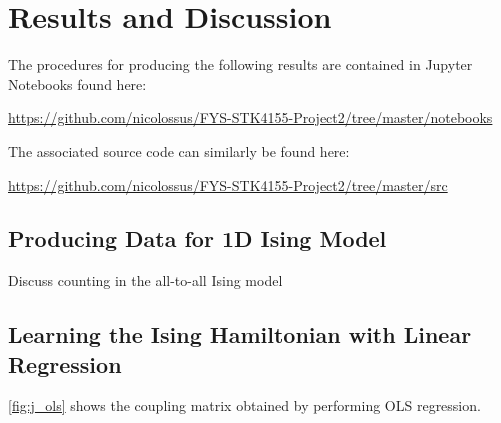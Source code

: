 \section{Results and Discussion}\label{sec:Results}

The procedures for producing the following results are contained in Jupyter Notebooks found here:
\begin{center}
    \url{https://github.com/nicolossus/FYS-STK4155-Project2/tree/master/notebooks}
\end{center}

The associated source code can similarly be found here: 
\begin{center}
    \url{https://github.com/nicolossus/FYS-STK4155-Project2/tree/master/src}
\end{center}

\subsection{Producing Data for 1D Ising Model}\label{sec:results datagen}

Discuss counting in the all-to-all Ising model

\subsection{Learning the Ising Hamiltonian with Linear Regression}\label{sec:results linreg}

\autoref{fig:j_ols} shows the coupling matrix obtained by performing OLS regression.

